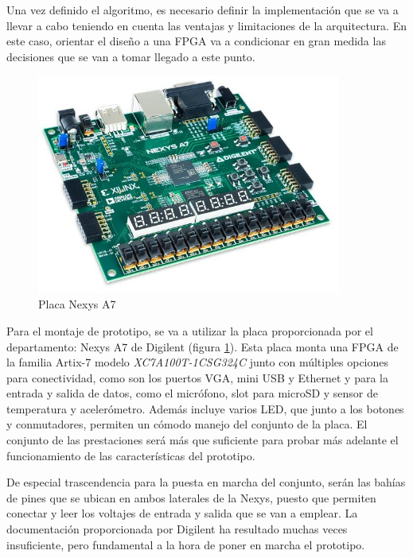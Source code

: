Una vez definido el algoritmo, es necesario definir la implementación que se va a llevar a cabo teniendo en cuenta las ventajas y limitaciones de la arquitectura. En este caso, orientar el diseño a una FPGA va a condicionar en gran medida las decisiones que se van a tomar llegado a este punto. 

\begin{figure}[!ht]
\begin{center}
\includegraphics[width=10cm]{img/nexysa7.jpg}
\caption{\label{fig:nexys}Placa Nexys A7}
\end{center}
\end{figure}

Para el montaje de prototipo, se va a utilizar la placa proporcionada por el departamento: Nexys A7 de Digilent (figura \ref{fig:nexys}). Esta placa monta una FPGA de la familia Artix-7 modelo \emph{XC7A100T-1CSG324C} junto con múltiples opciones para conectividad, como son los puertos VGA, mini USB y Ethernet y para la entrada y salida de datos, como el micrófono, slot para microSD y sensor de temperatura y acelerómetro. Además incluye varios LED, que junto a los botones y conmutadores, permiten un cómodo manejo del conjunto de la placa. El conjunto de las prestaciones será más que suficiente para probar más adelante el funcionamiento de las características del prototipo.

De especial trascendencia para la puesta en marcha del conjunto, serán las bahías de pines que se ubican en ambos laterales de la Nexys, puesto que permiten conectar y leer los voltajes de entrada y salida que se van a emplear. La documentación proporcionada por Digilent \cite{Nexys} ha resultado muchas veces insuficiente, pero fundamental a la hora de poner en marcha el prototipo.

